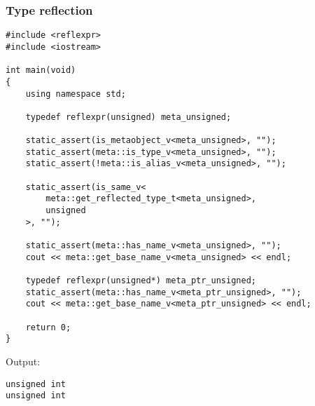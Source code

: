 \subsubsection{Type reflection}

\begin{verbatim}
#include <reflexpr>
#include <iostream>

int main(void)
{
	using namespace std;

	typedef reflexpr(unsigned) meta_unsigned;

	static_assert(is_metaobject_v<meta_unsigned>, "");
	static_assert(meta::is_type_v<meta_unsigned>, "");
	static_assert(!meta::is_alias_v<meta_unsigned>, "");

	static_assert(is_same_v<
		meta::get_reflected_type_t<meta_unsigned>,
		unsigned
	>, "");

	static_assert(meta::has_name_v<meta_unsigned>, "");
	cout << meta::get_base_name_v<meta_unsigned> << endl;

	typedef reflexpr(unsigned*) meta_ptr_unsigned;
	static_assert(meta::has_name_v<meta_ptr_unsigned>, "");
	cout << meta::get_base_name_v<meta_ptr_unsigned> << endl;

	return 0;
}
\end{verbatim}

Output:

\begin{verbatim}
unsigned int
unsigned int
\end{verbatim}

